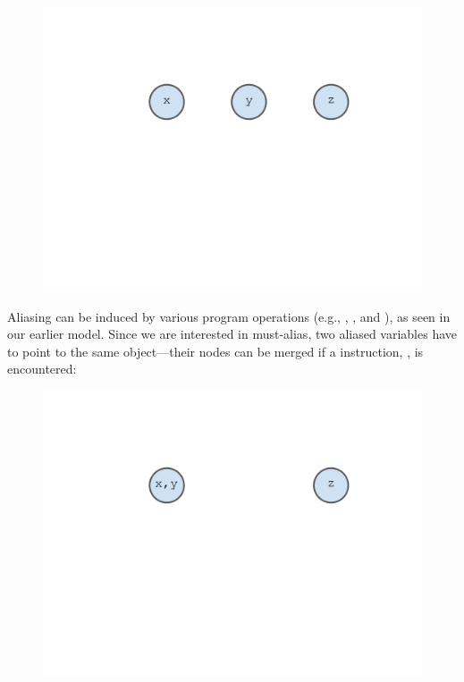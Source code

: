\begin{figure}[h]
  \begin{minipage}[b]{\linewidth}
    \centering
    \includegraphics[trim={35mm 115mm 35mm 51mm},clip,width=0.8\linewidth]{assets/must-data/alias-graph0.pdf}
  \end{minipage}
\end{figure}

Aliasing can be induced by various program operations (e.g.,
, , and ), as seen in
our earlier model. Since we are interested in must-alias, two
aliased variables have to point to the same object---their nodes
can be merged if a  instruction, , is
encountered:

\begin{figure}[h]
  \begin{minipage}[b]{\linewidth}
    \centering
    \includegraphics[trim={35mm 115mm 35mm 51mm},clip,width=0.8\linewidth]{assets/must-data/alias-graph1.pdf}
  \end{minipage}
\end{figure}

